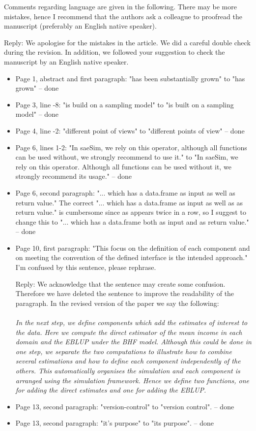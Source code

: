 \documentclass[11pt]{article}
\begin{document}
\vspace{0.5cm}

\noindent Comments regarding language are given in the following. There may be more mistakes, hence I recommend that the authors ask a colleague to proofread the manuscript (preferably an English native speaker).

\noindent Reply: We apologise for the mistakes in the article. We did a careful double check during the revision. In addition, we followed your suggestion to check the manuscript by an English native speaker.

\begin{itemize}
\item
	Page 1, abstract and first paragraph: "has been substantially grown" to "has grown" -- done
\item
	Page 3, line -8: "is build on a sampling model" to "is built on a sampling model" -- done
\item
	Page 4, line -2: "different point of views" to "different points of view" -- done
\item
	Page 6, lines 1-2: "In saeSim, we rely on this operator, although all functions can be used without, we strongly recommend to use it." to "In saeSim, we rely on this operator. Although all functions can be used without it, we strongly recommend its usage." -- done
\item
	Page 6, second paragraph: "... which has a data.frame as input as well as return value." The correct "... which has a data.frame as input as well as as return value." is cumbersome since as appears twice in a row, so I suggest to change this to "... which has a data.frame both as input and as return value."  -- done

\item
	Page 10, first paragraph: "This focus on the definition of each component and on meeting the convention of the defined interface is the intended approach." I'm confused by this sentence, please rephrase.
	
	Reply: We acknowledge that the sentence may create some confusion. Therefore we have deleted the sentence to improve the readability of the paragraph. In the revised version of the paper we say the following:\\\\
	\textit{
In the next step, we define components which add the estimates of interest to the data. Here
we compute the direct estimator of the mean income in each domain and the EBLUP under
the BHF model. Although this could be done in one step, we separate the two computations to
illustrate how to combine several estimations and how to define each component independently
of the others. This automatically organises the simulation and each component is arranged
using the simulation framework. Hence we define two functions, one for adding the direct
estimates and one for adding the EBLUP.
		}
\item
	Page 13, second paragraph: "version-control" to "version control". -- done
\item
	Page 13, second paragraph: "it's purpose" to "its purpose". -- done
\end{itemize}
\end{document}
